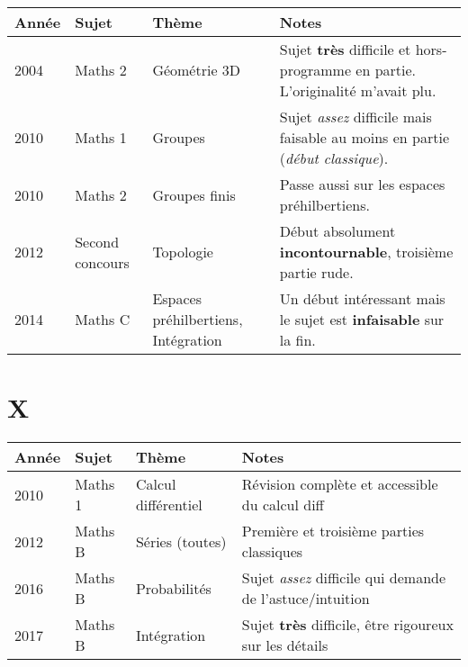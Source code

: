 \documentclass{article}
\begin{document}
\begin{tabular}{ |p{1cm} | p{2cm} | p{3cm} | p{8cm}| }
 Année  &  Sujet            &  Thème                                &  Notes \\
\hline\hline

 2004   &  Maths 2          &  Géométrie 3D                         &  Sujet \textbf{très} difficile et hors-programme en partie. L'originalité m'avait plu. \\\hline

 2010   &  Maths 1          &  Groupes                              &  Sujet \textit{assez} difficile mais faisable au moins en partie (\textit{début classique}). \\\hline

 2010   &  Maths 2          &  Groupes finis                        &  Passe aussi sur les espaces préhilbertiens. \\\hline

 2012   &  Second concours  &  Topologie                            &  Début absolument \textbf{incontournable}, troisième partie rude. \\\hline

 2014   &  Maths C          &  Espaces préhilbertiens, Intégration  &  Un début intéressant mais le sujet est \textbf{infaisable} sur la fin. \\\hline

\end{tabular}

\section{X}

\begin{tabular}{ |p{1cm} | p{2cm} | p{3cm} | p{8cm}| }
 Année  &  Sujet            &  Thème                                &  Notes \\
\hline\hline

 2010   &  Maths 1          &  Calcul différentiel                  &  Révision complète et accessible du calcul diff \\\hline

 2012   &  Maths B          &  Séries (toutes)                      &  Première et troisième parties classiques \\\hline

 2016   &  Maths B          &  Probabilités                         &  Sujet \textit{assez} difficile qui demande de l'astuce/intuition \\\hline

 2017   &  Maths B          &  Intégration                          &  Sujet \textbf{très} difficile, être rigoureux sur les détails \\\hline

\end{tabular}
\end{document}

